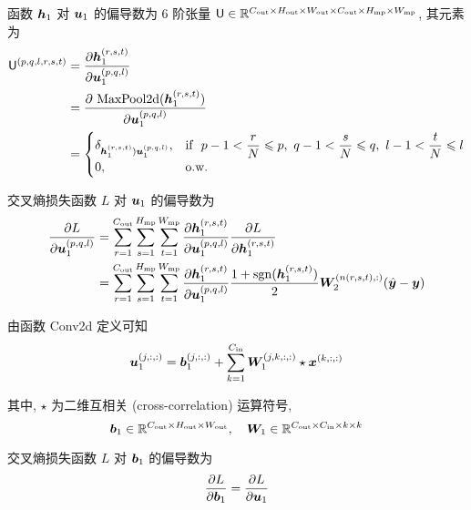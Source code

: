 \documentclass{article}
\begin{document}
函数 $\bm{h}_1$ 对 $\bm{u}_1$ 的偏导数为 6 阶张量 $\mathsf{U}\in\mathbb{R}^{C_{\text{out}}\times H_{\text{out}}\times W_{\text{out}}\times C_{\text{out}}\times H_{\text{mp}}\times W_{\text{mp}}}$, 其元素为
\begin{equation}
  \begin{aligned}
    \mathsf{U}^{(p,q,l,r,s,t)}
    &=\frac{\partial\bm{h}_1^{(r,s,t)}}{\partial\bm{u}_1^{(p,q,l)}}\\
    &=\frac{\partial~\mathrm{MaxPool2d}(\bm{h}_1^{(r,s,t)})}{\partial\bm{u}_1^{(p,q,l)}}\\
    &=\begin{cases}
      \delta_{\bm{h}_1^{(r,s,t)})\bm{u}_1^{(p,q,l)}},&\text{if}~~p-1<\dfrac{r}{N}\leqslant p,~q-1<\dfrac{s}{N}\leqslant q,~l-1<\dfrac{t}{N}\leqslant l\\[1mm]
      0,&\text{o.w.}
    \end{cases}
  \end{aligned}
\end{equation}

交叉熵损失函数 $L$ 对 $\bm{u}_1$ 的偏导数为
\begin{equation}
  \begin{aligned}
    \frac{\partial L}{\partial\bm{u}_1^{(p,q,l)}}
    &=\sum_{r=1}^{C_{\text{out}}}\sum_{s=1}^{H_{\text{mp}}}\sum_{t=1}^{W_{\text{mp}}}
    \frac{\partial\bm{h}_1^{(r,s,t)}}{\partial\bm{u}_1^{(p,q,l)}}
    \frac{\partial L}{\partial\bm{h}_1^{(r,s,t)}}\\
    &=\sum_{r=1}^{C_{\text{out}}}\sum_{s=1}^{H_{\text{mp}}}\sum_{t=1}^{W_{\text{mp}}}
    \frac{\partial\bm{h}_1^{(r,s,t)}}{\partial\bm{u}_1^{(p,q,l)}}
    \frac{1+\operatorname{sgn}(\bm{h}_1^{(r,s,t)})}{2}\bm{W}_2^{(n(r,s,t),:)}(\hat{\bm{y}}-\bm{y})\\
  \end{aligned}
\end{equation}

由函数 Conv2d 定义可知
\begin{equation}
  \bm{u}_1^{(j,:,:)}=\bm{b}_1^{(j,:,:)}+\sum_{k=1}^{C_{\text{in}}}\bm{W}_1^{(j,k,:,:)}\star\bm{x}^{(k,:,:)}
\end{equation}

其中, $\star$ 为二维互相关 (cross-correlation) 运算符号,
\begin{equation}
  \bm{b}_1\in\mathbb{R}^{C_{\text{out}}\times H_{\text{out}}\times W_{\text{out}}},
  \quad
  \bm{W}_1\in\mathbb{R}^{C_{\text{out}}\times C_{\text{in}}\times k\times k}
\end{equation}

交叉熵损失函数 $L$ 对 $\bm{b}_1$ 的偏导数为
\begin{equation}
  \frac{\partial L}{\partial\bm{b}_1}=\frac{\partial L}{\partial\bm{u}_1}
\end{equation}
\end{document}
